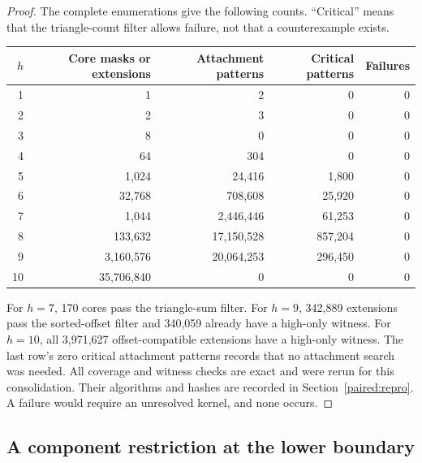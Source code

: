 \documentclass[11pt,a4paper]{article}
\theoremstyle{definition}\newtheorem{definition}[theorem]{Definition}
\theoremstyle{remark}\newtheorem{remark}[theorem]{Remark}
\begin{document}
\begin{proof}
The complete enumerations give the following counts. ``Critical''
means that the triangle-count filter allows failure, not that a
counterexample exists.
\begin{center}\small
\begin{tabular}{rrrrr}
\toprule
$h$&Core masks or extensions&Attachment patterns&Critical patterns&Failures\\
\midrule
1&1&2&0&0\\
2&2&3&0&0\\
3&8&0&0&0\\
4&64&304&0&0\\
5&1,024&24,416&1,800&0\\
6&32,768&708,608&25,920&0\\
7&1,044&2,446,446&61,253&0\\
8&133,632&17,150,528&857,204&0\\
9&3,160,576&20,064,253&296,450&0\\
10&35,706,840&0&0&0\\
\bottomrule
\end{tabular}
\end{center}
For $h=7$, 170 cores pass the triangle-sum filter. For $h=9$,
342,889 extensions pass the sorted-offset filter and 340,059 already
have a high-only witness. For $h=10$, all 3,971,627 offset-compatible
extensions have a high-only witness. The last row's zero critical
attachment patterns records that no attachment search was needed.
All coverage and witness checks are exact and were rerun for this
consolidation. Their algorithms and hashes are recorded in
Section~\ref{paired:repro}. A failure would require an unresolved
kernel, and none occurs.
\end{proof}

\subsection{A component restriction at the lower boundary}
\label{paired:components-section}
\end{document}

